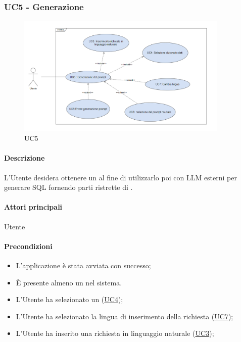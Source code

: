 \subsubsection{UC5 - Generazione }\label{UC5}

\begin{figure}[H]
  \centering
  \includegraphics[width=0.90\textwidth]{assets/uc5.png}
  \caption{UC5}
\end{figure}

\paragraph*{Descrizione}
L’Utente desidera ottenere un  al fine di utilizzarlo poi con LLM esterni per generare  SQL fornendo parti ristrette di .

\paragraph*{Attori principali}
Utente

\paragraph*{Precondizioni}
\begin{itemize}
  \item L'applicazione è stata avviata con successo;
  \item È presente almeno un  nel sistema.
  \item L'Utente ha selezionato un  (\hyperref[UC4]{UC4});
  \item L'Utente ha selezionato la lingua di inserimento della richiesta (\hyperref[UC7]{UC7});
  \item L'Utente ha inserito una richiesta in linguaggio naturale (\hyperref[UC3]{UC3});
\end{itemize}

